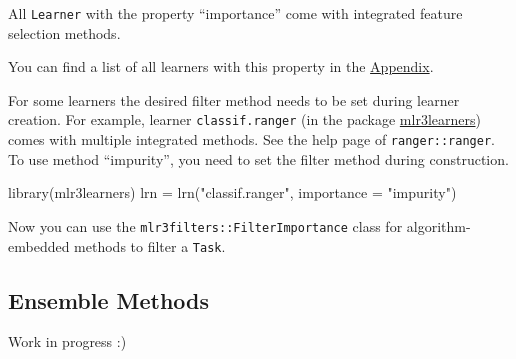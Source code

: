 \documentclass[
  11pt,
  parskip=half,
  DIV=calc,
  BCOR=10mm,
  x11names]{scrbook}
\makeatletter
\newenvironment{Shaded}{}{}
\newcommand{\DataTypeTok}[1]{#1}
\newcommand{\DecValTok}[1]{#1}
\newcommand{\KeywordTok}[1]{\textcolor[rgb]{0.00,0.00,1.00}{#1}}
\newcommand{\NormalTok}[1]{#1}
\newcommand{\OperatorTok}[1]{#1}
\newcommand{\StringTok}[1]{\textcolor[rgb]{0.00,0.50,0.50}{#1}}
\newenvironment{kframe}{%
\medskip{}
\setlength{\fboxsep}{.8em}
 \def\at@end@of@kframe{}%
 \ifinner\ifhmode%
  \def\at@end@of@kframe{\end{minipage}}%
  \begin{minipage}{\columnwidth}%
 \fi\fi%
 \def\FrameCommand##1{\hskip\@totalleftmargin \hskip-\fboxsep
 \colorbox{shadecolor}{##1}\hskip-\fboxsep
     \hskip-\linewidth \hskip-\@totalleftmargin \hskip\columnwidth}%
 \MakeFramed {\advance\hsize-\width
   \@totalleftmargin\z@ \linewidth\hsize
   \@setminipage}}%
 {\par\unskip\endMakeFramed%
 \at@end@of@kframe}
\newenvironment{rmdblock}[1]
  {
  \begin{itemize}
  \renewcommand{\labelitemi}{
    \raisebox{-.7\height}[0pt][0pt]{
      {\setkeys{Gin}{width=3em,keepaspectratio}\texttt{[image: images/\#1]}}
    }
  }
  \setlength{\fboxsep}{1em}
  \begin{kframe}
  \item
  }
  {
  \end{kframe}
  \end{itemize}
  }
\newenvironment{warning}
  {\begin{rmdblock}{warning}}
  {\end{rmdblock}}
\makeatother
\begin{document}
All \texttt{Learner} with the property ``importance'' come with integrated feature selection methods.

You can find a list of all learners with this property in the \protect\hyperlink{fs-filter-embedded-list}{Appendix}.

For some learners the desired filter method needs to be set during learner creation.
For example, learner \texttt{classif.ranger} (in the package \href{https://mlr3learners.mlr-org.com}{mlr3learners}) comes with multiple integrated methods.
See the help page of \texttt{ranger::ranger}.
To use method ``impurity'', you need to set the filter method during construction.

\begin{Shaded}
\begin{Highlighting}[]
\KeywordTok{library}\NormalTok{(mlr3learners)}
\NormalTok{lrn =}\StringTok{ }\KeywordTok{lrn}\NormalTok{(}\StringTok{"classif.ranger"}\NormalTok{, }\DataTypeTok{importance =} \StringTok{"impurity"}\NormalTok{)}
\end{Highlighting}
\end{Shaded}

Now you can use the \texttt{mlr3filters::FilterImportance} class for algorithm-embedded methods to filter a \texttt{Task}.

\begin{Shaded}
\end{Shaded}

\hypertarget{fs-ensemble}{%
\subsection{Ensemble Methods}\label{fs-ensemble}}

\begin{warning}
Work in progress :)
\end{warning}
\end{document}
